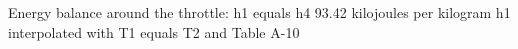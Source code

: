 Energy balance around the throttle:  
h1 equals h4  
93.42 kilojoules per kilogram  
h1 interpolated with T1 equals T2 and Table A-10